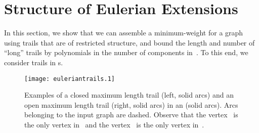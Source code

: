 \section{Structure of Eulerian Extensions}
\label{sec:trails}

In this section, we show that we can assemble a minimum-weight \EE{} for a graph~ using trails that are of restricted structure, and bound the length and number of ``long'' trails by polynomials in the number of components in~. To this end, we consider trails in \EE s. 
\begin{figure}
  \begin{center}
    \texttt{[image: euleriantrails.1]}
    \caption{Examples of a closed maximum length trail (left, solid arcs) and an open maximum length trail (right, solid arcs) in an \EE{} (solid arcs). Arcs belonging to the input graph are dashed. Observe that the vertex~ is the only vertex in~ and the vertex~ is the only vertex in~.}
    \label{fig:pmetrails}
  \end{center}
\end{figure}

